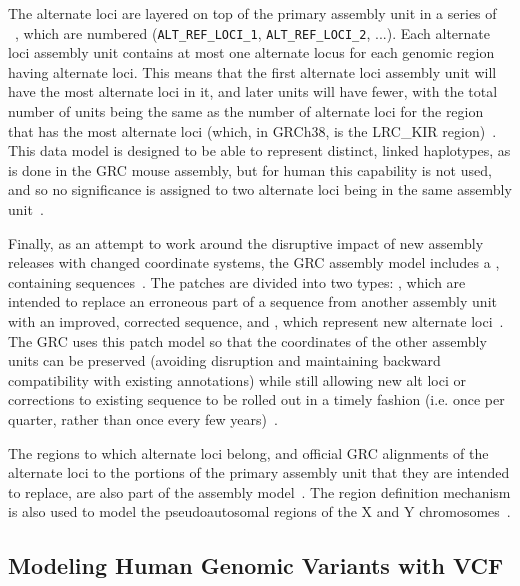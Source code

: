 The alternate loci are layered on top of the primary assembly unit in a series of ~\cite{schneider2013genome}, which are numbered (\texttt{ALT\_REF\_LOCI\_1}, \texttt{ALT\_REF\_LOCI\_2}, ...). Each alternate loci assembly unit contains at most one alternate locus for each genomic region having alternate loci. This means that the first alternate loci assembly unit will have the most alternate loci in it, and later units will have fewer, with the total number of units being the same as the number of alternate loci for the region that has the most alternate loci (which, in GRCh38, is the LRC\_KIR region)~\cite{grc2013announcing,schneider2013genome}. This data model is designed to be able to represent distinct, linked haplotypes, as is done in the GRC mouse assembly, but for human this capability is not used, and so no significance is assigned to two alternate loci being in the same assembly unit~\cite{schneider2013genome}.

Finally, as an attempt to work around the disruptive impact of new assembly releases with changed coordinate systems, the GRC assembly model includes a , containing  sequences~\cite{schneider2013genome}. The patches are divided into two types: , which are intended to replace an erroneous part of a sequence from another assembly unit with an improved, corrected sequence, and , which represent new alternate loci~\cite{schneider2013genome}. The GRC uses this patch model so that the coordinates of the other assembly units can be preserved (avoiding disruption and maintaining backward compatibility with existing annotations) while still allowing new alt loci or corrections to existing sequence to be rolled out in a timely fashion (i.e. once per quarter, rather than once every few years)~\cite{schneider2013genome}.

The regions to which alternate loci belong, and official GRC alignments of the alternate loci to the portions of the primary assembly unit that they are intended to replace, are also part of the assembly model~\cite{schneider2013genome}. The region definition mechanism is also used to model the pseudoautosomal regions of the X and Y chromosomes~\cite{schneider2013genome}.
    
\subsection{Modeling Human Genomic Variants with VCF}

